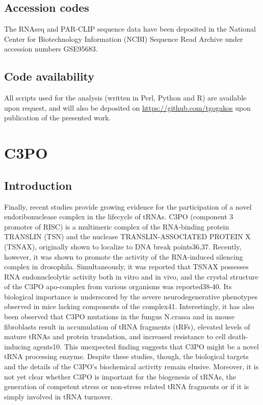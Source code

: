 \documentclass[12pt]{rockefeller}
\begin{document}
\section{Accession codes}
The RNAseq and PAR-CLIP sequence data have been deposited in the National Center for Biotechnology Information (NCBI) Sequence Read Archive under accession numbers GSE95683.

\section{Code availability}
All scripts used for the analysis (written in Perl, Python and R) are available upon request, and will also be deposited on \url{https://github.com/tgogakos} upon publication of the presented work.  

\chapter{C3PO}
\section{Introduction}
Finally, recent studies provide growing evidence for the participation of a novel endoribonuclease complex in the lifecycle of tRNAs. C3PO (component 3 promoter of RISC) is a multimeric complex of the RNA-binding protein TRANSLIN (TSN) and the nuclease TRANSLIN-ASSOCIATED PROTEIN X (TSNAX), originally shown to localize to DNA break points36,37. Recently, however, it was shown to promote the activity of the RNA-induced silencing complex in drosophila. Simultaneously, it was reported that TSNAX possesses RNA endonucleolytic activity both in vitro and in vivo, and the crystal structure of the C3PO apo-complex from various organisms was reported38-40. Its biological importance is underscored by the severe neurodegenerative phenotypes observed in mice lacking components of the complex41. Interestingly, it has also been observed that C3PO mutations in the fungus N.crassa and in mouse fibroblasts result in accumulation of tRNA fragments (tRFs), elevated levels of mature tRNAs and protein translation, and increased resistance to cell death-inducing agents10. This unexpected finding suggests that C3PO might be a novel tRNA processing enzyme. Despite these studies, though, the biological targets and the details of the C3PO’s biochemical activity remain elusive. Moreover, it is not yet clear whether C3PO is important for the biogenesis of tRNAs, the generation of competent stress or non-stress related tRNA fragments or if it is simply involved in tRNA turnover. 
\end{document}
